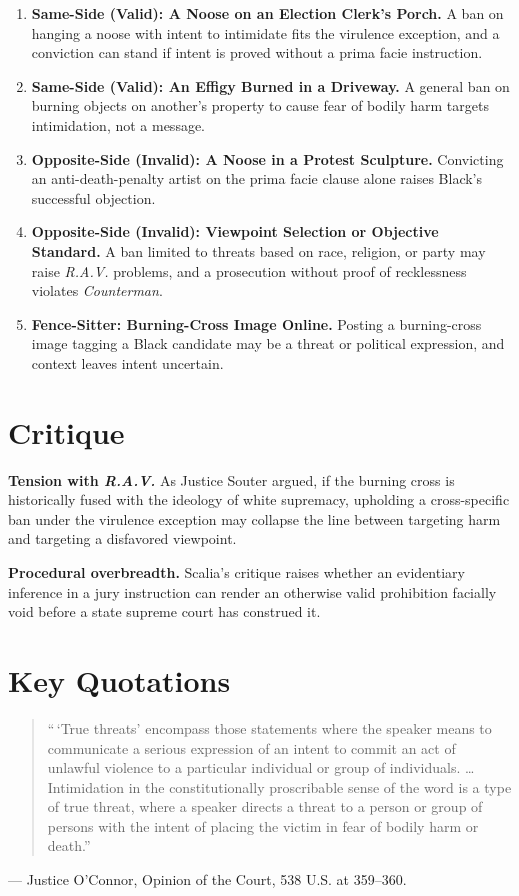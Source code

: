 \documentclass[12pt]{article}
\begin{document}
\begin{enumerate}
\item \textbf{Same-Side (Valid): A Noose on an Election Clerk's Porch.} A ban on hanging a noose with intent to intimidate fits the virulence exception, and a conviction can stand if intent is proved without a prima facie instruction.
\item \textbf{Same-Side (Valid): An Effigy Burned in a Driveway.} A general ban on burning objects on another's property to cause fear of bodily harm targets intimidation, not a message.
\item \textbf{Opposite-Side (Invalid): A Noose in a Protest Sculpture.} Convicting an anti-death-penalty artist on the prima facie clause alone raises Black's successful objection.
\item \textbf{Opposite-Side (Invalid): Viewpoint Selection or Objective Standard.} A ban limited to threats based on race, religion, or party may raise \textit{R.A.V.} problems, and a prosecution without proof of recklessness violates \textit{Counterman}.
\item \textbf{Fence-Sitter: Burning-Cross Image Online.} Posting a burning-cross image tagging a Black candidate may be a threat or political expression, and context leaves intent uncertain.
\end{enumerate}

\section{Critique}

\textbf{Tension with \textit{R.A.V.}} As Justice Souter argued, if the burning cross is historically fused with the ideology of white supremacy, upholding a cross-specific ban under the virulence exception may collapse the line between targeting harm and targeting a disfavored viewpoint.

\textbf{Procedural overbreadth.} Scalia's critique raises whether an evidentiary inference in a jury instruction can render an otherwise valid prohibition facially void before a state supreme court has construed it.

\section{Key Quotations}

\begin{quote}
``\,`True threats' encompass those statements where the speaker means to communicate a serious expression of an intent to commit an act of unlawful violence to a particular individual or group of individuals. \dots Intimidation in the constitutionally proscribable sense of the word is a type of true threat, where a speaker directs a threat to a person or group of persons with the intent of placing the victim in fear of bodily harm or death.''
\end{quote}
\noindent --- Justice O'Connor, Opinion of the Court, 538 U.S. at 359--360.
\end{document}

